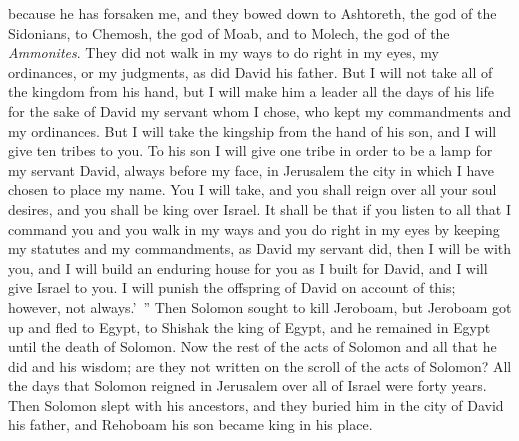 \begin{biblechapter}
\verse because he has forsaken me, and they bowed down to Ashtoreth, the god of the Sidonians, to Chemosh, the god of Moab, and to Molech, the god of the \textit{Ammonites}. They did not walk in my ways to do right in my eyes, my ordinances, or my judgments, as did David his father.
\verse But I will not take all of the kingdom from his hand, but I will make him a leader all the days of his life for the sake of David my servant whom I chose, who kept my commandments and my ordinances.
\verse But I will take the kingship from the hand of his son, and I will give ten tribes to you.
\verse To his son I will give one tribe in order to be a lamp for my servant David, always before my face, in Jerusalem the city in which I have chosen to place my name.
\verse You I will take, and you shall reign over all your soul desires, and you shall be king over Israel.
\verse It shall be that if you listen to all that I command you and you walk in my ways and you do right in my eyes by keeping my statutes and my commandments, as David my servant did, then I will be with you, and I will build an enduring house for you as I built for David, and I will give Israel to you.
\verse I will punish the offspring of David on account of this; however, not always.’ ”
\verse Then Solomon sought to kill Jeroboam, but Jeroboam got up and fled to Egypt, to Shishak the king of Egypt, and he remained in Egypt until the death of Solomon.
\verse Now the rest of the acts of Solomon and all that he did and his wisdom; are they not written on the scroll of the acts of Solomon?
\verse All the days that Solomon reigned in Jerusalem over all of Israel were forty years.
\verse Then Solomon slept with his ancestors, and they buried him in the city of David his father, and Rehoboam his son became king in his place.
\end{biblechapter}

